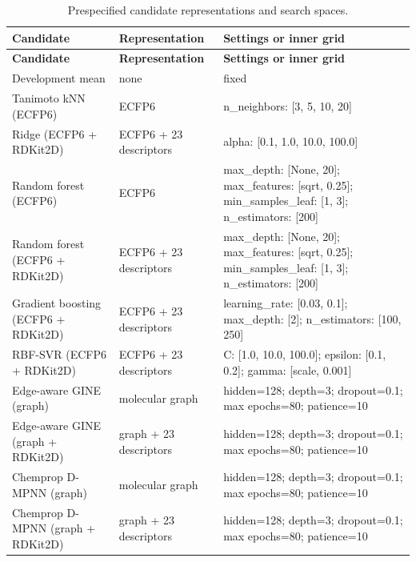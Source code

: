 \begin{longtable}{L{0.25\textwidth}L{0.19\textwidth}L{0.48\textwidth}}
\caption{Prespecified candidate representations and search spaces.}\label{tab:hyperparameters}\\
\toprule
\textbf{Candidate} & \textbf{Representation} & \textbf{Settings or inner grid} \\
\midrule
\endfirsthead
\toprule
\textbf{Candidate} & \textbf{Representation} & \textbf{Settings or inner grid} \\
\midrule
\endhead
Development mean & none & fixed \\
Tanimoto kNN (ECFP6) & ECFP6 & n\_neighbors: [3, 5, 10, 20] \\
Ridge (ECFP6 + RDKit2D) & ECFP6 + 23 descriptors & alpha: [0.1, 1.0, 10.0, 100.0] \\
Random forest (ECFP6) & ECFP6 & max\_depth: [None, 20]; max\_features: [sqrt, 0.25]; min\_samples\_leaf: [1, 3]; n\_estimators: [200] \\
Random forest (ECFP6 + RDKit2D) & ECFP6 + 23 descriptors & max\_depth: [None, 20]; max\_features: [sqrt, 0.25]; min\_samples\_leaf: [1, 3]; n\_estimators: [200] \\
Gradient boosting (ECFP6 + RDKit2D) & ECFP6 + 23 descriptors & learning\_rate: [0.03, 0.1]; max\_depth: [2]; n\_estimators: [100, 250] \\
RBF-SVR (ECFP6 + RDKit2D) & ECFP6 + 23 descriptors & C: [1.0, 10.0, 100.0]; epsilon: [0.1, 0.2]; gamma: [scale, 0.001] \\
Edge-aware GINE (graph) & molecular graph & hidden=128; depth=3; dropout=0.1; max epochs=80; patience=10 \\
Edge-aware GINE (graph + RDKit2D) & graph + 23 descriptors & hidden=128; depth=3; dropout=0.1; max epochs=80; patience=10 \\
Chemprop D-MPNN (graph) & molecular graph & hidden=128; depth=3; dropout=0.1; max epochs=80; patience=10 \\
Chemprop D-MPNN (graph + RDKit2D) & graph + 23 descriptors & hidden=128; depth=3; dropout=0.1; max epochs=80; patience=10 \\
\bottomrule
\end{longtable}
